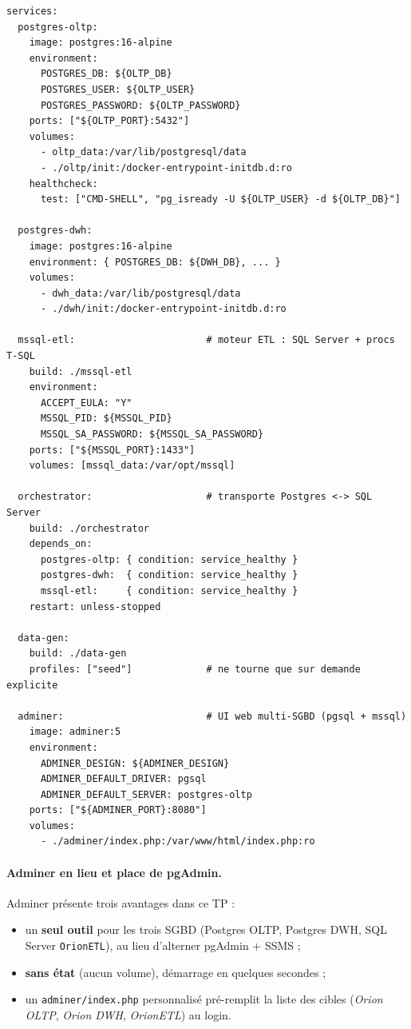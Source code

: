 \documentclass[11pt,a4paper]{article}
\newcommand{\code}[1]{\texttt{\small #1}}
\begin{document}
\begin{lstlisting}[style=yml,caption={Services principaux (\texttt{docker-compose.yml})},label={lst:compose}]
services:
  postgres-oltp:
    image: postgres:16-alpine
    environment:
      POSTGRES_DB: ${OLTP_DB}
      POSTGRES_USER: ${OLTP_USER}
      POSTGRES_PASSWORD: ${OLTP_PASSWORD}
    ports: ["${OLTP_PORT}:5432"]
    volumes:
      - oltp_data:/var/lib/postgresql/data
      - ./oltp/init:/docker-entrypoint-initdb.d:ro
    healthcheck:
      test: ["CMD-SHELL", "pg_isready -U ${OLTP_USER} -d ${OLTP_DB}"]

  postgres-dwh:
    image: postgres:16-alpine
    environment: { POSTGRES_DB: ${DWH_DB}, ... }
    volumes:
      - dwh_data:/var/lib/postgresql/data
      - ./dwh/init:/docker-entrypoint-initdb.d:ro

  mssql-etl:                       # moteur ETL : SQL Server + procs T-SQL
    build: ./mssql-etl
    environment:
      ACCEPT_EULA: "Y"
      MSSQL_PID: ${MSSQL_PID}
      MSSQL_SA_PASSWORD: ${MSSQL_SA_PASSWORD}
    ports: ["${MSSQL_PORT}:1433"]
    volumes: [mssql_data:/var/opt/mssql]

  orchestrator:                    # transporte Postgres <-> SQL Server
    build: ./orchestrator
    depends_on:
      postgres-oltp: { condition: service_healthy }
      postgres-dwh:  { condition: service_healthy }
      mssql-etl:     { condition: service_healthy }
    restart: unless-stopped

  data-gen:
    build: ./data-gen
    profiles: ["seed"]             # ne tourne que sur demande explicite

  adminer:                         # UI web multi-SGBD (pgsql + mssql)
    image: adminer:5
    environment:
      ADMINER_DESIGN: ${ADMINER_DESIGN}
      ADMINER_DEFAULT_DRIVER: pgsql
      ADMINER_DEFAULT_SERVER: postgres-oltp
    ports: ["${ADMINER_PORT}:8080"]
    volumes:
      - ./adminer/index.php:/var/www/html/index.php:ro
\end{lstlisting}

\paragraph{Adminer en lieu et place de pgAdmin.}
Adminer présente trois avantages dans ce TP :
\begin{itemize}
  \item un \textbf{seul outil} pour les trois SGBD (Postgres OLTP, Postgres
        DWH, SQL Server \code{OrionETL}), au lieu d'alterner pgAdmin + SSMS ;
  \item \textbf{sans état} (aucun volume), démarrage en quelques secondes ;
  \item un \texttt{adminer/index.php} personnalisé pré-remplit la liste des
        cibles (\emph{Orion OLTP}, \emph{Orion DWH}, \emph{OrionETL}) au login.
\end{itemize}
\end{document}
